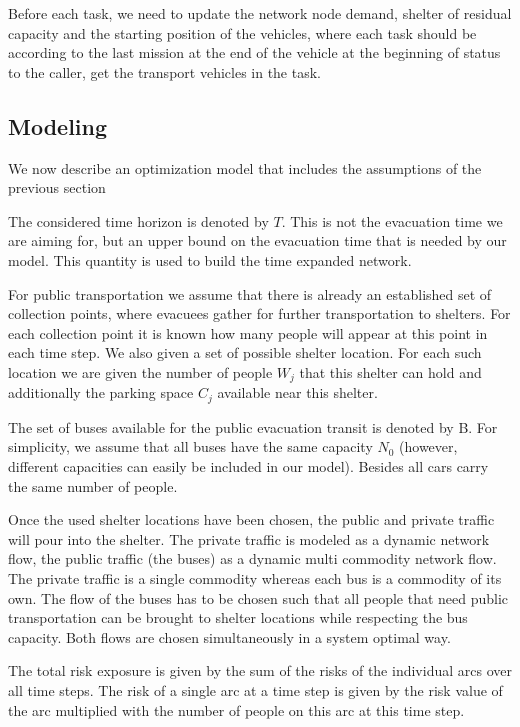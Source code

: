 \documentclass{mcmthesis}
\begin{document}
Before each task, we need to update the network node demand, shelter of residual capacity and the starting position of the vehicles, where each task should be according to the last mission at the end of the vehicle at the beginning of status to the caller, get the transport vehicles in the task.

\subsection{Modeling}

We now describe an optimization model that includes the assumptions of the previous section %

The considered time horizon is denoted by $T$. This is not the evacuation time we are aiming for, but an upper bound on the evacuation time that is needed by our model. This quantity is used to build the time expanded network.

For public transportation we assume that there is already an established set of collection points, where evacuees gather for further transportation to shelters. For each collection point it is known how many people will appear at this point in each time step. We also given a set of possible shelter location. For each such location we are given the number of people ${W_j}$ that this shelter can hold and additionally the parking space ${C_j}$ available near this shelter.

The set of buses available for the public evacuation transit is denoted by B. For simplicity, we assume that all buses have the same capacity ${N_0}$ (however, different capacities can easily be included in our model). Besides all cars carry the same number of people.

Once the used shelter locations have been chosen, the public and private traffic will pour into the shelter. The private traffic is modeled as a dynamic network flow, the public traffic (the buses) as a dynamic multi commodity network flow. The private traffic is a single commodity whereas each bus is a commodity of its own. The flow of the buses has to be chosen such that all people that need public transportation can be brought to shelter locations while respecting the bus capacity. Both flows are chosen simultaneously in a system optimal way.

The total risk exposure is given by the sum of the risks of the individual arcs over all time steps. The risk of a single arc at a time step is given by the risk value of the arc multiplied with the number of people on this arc at this time step.
\end{document}
